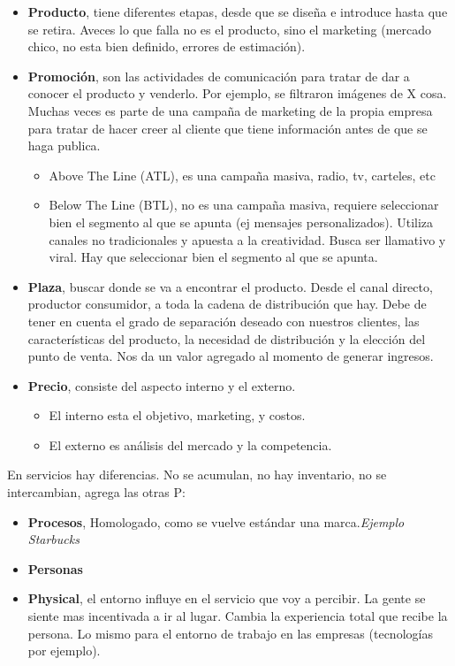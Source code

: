 \documentclass[titlepage,a4paper]{article}
\begin{document}
\begin{itemize}
\item \textbf{Producto}, tiene diferentes etapas, desde que se diseña e introduce hasta que se retira. Aveces lo que falla no es el producto, sino el marketing (mercado chico, no esta bien definido, errores de estimación).
\item \textbf{Promoción}, son las actividades de comunicación para tratar de dar a conocer el producto y venderlo. Por ejemplo, se filtraron imágenes de X cosa. Muchas veces es parte de una campaña de marketing de la propia empresa para tratar de hacer creer al cliente que tiene información antes de que se haga publica.
\begin{itemize}
\item Above The Line (ATL), es una campaña masiva, radio, tv, carteles, etc
\item Below The Line (BTL), no es una campaña masiva, requiere seleccionar bien el segmento al que se apunta (ej mensajes personalizados). Utiliza canales no tradicionales y apuesta a la creatividad. Busca ser llamativo y viral. Hay que seleccionar bien el segmento al que se apunta.
\end{itemize}
\item \textbf{Plaza}, buscar donde se va a encontrar el producto. Desde el canal directo, productor consumidor, a toda la cadena de distribución que hay. Debe de tener en cuenta el grado de separación deseado con nuestros clientes, las características del producto, la necesidad de distribución y la elección del punto de venta. Nos da un valor agregado al momento de generar ingresos.
\item \textbf{Precio}, consiste del aspecto interno y el externo.
\begin{itemize}
\item El interno esta el objetivo, marketing, y costos.
\item El externo es análisis del mercado y la competencia.
\end{itemize}
\end{itemize}

En servicios hay diferencias. No se acumulan, no hay inventario, no se intercambian, agrega las otras P:
\begin{itemize}
\item \textbf{Procesos}, Homologado, como se vuelve estándar una marca.\textit{Ejemplo Starbucks}
\item \textbf{Personas}
\item \textbf{Physical}, el entorno influye en el servicio que voy a percibir. La gente se siente mas incentivada a ir al lugar. Cambia la experiencia total que recibe la persona. Lo mismo para el entorno de trabajo en las empresas (tecnologías por ejemplo).
\end{itemize}
\end{document}
